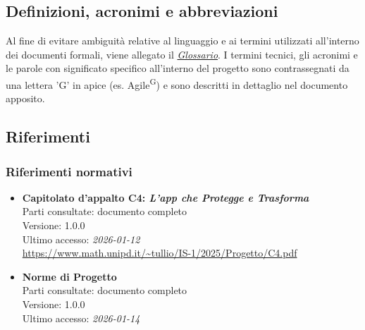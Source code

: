\documentclass[a4paper,12pt]{article}
\begin{document}

\subsection{Definizioni, acronimi e abbreviazioni} \label{sec:definizioni_acronimi_abbreviazioni}

Al fine di evitare ambiguità relative al linguaggio e ai termini utilizzati all'interno dei documenti formali, viene allegato il \href{https://swe-bitbybit.github.io/SWE-docs/docs/RTB/documenti_interni/Glossario.pdf}{\textit{Glossario}}.
I termini tecnici, gli acronimi e le parole con significato specifico all'interno del progetto sono contrassegnati da una lettera 'G' in apice (es. Agile\textsuperscript{G}) e sono descritti in dettaglio nel documento apposito.


\subsection{Riferimenti} \label{sec:riferimenti}

\subsubsection{Riferimenti normativi}\label{sec:riferimenti_normativi}
\begin{itemize}
\item \textbf{Capitolato d'appalto C4: \emph{L'app che Protegge e Trasforma}}\\
Parti consultate: documento completo\\
Versione: 1.0.0\\
Ultimo accesso: \textit{2026-01-12}\\
\url{https://www.math.unipd.it/~tullio/IS-1/2025/Progetto/C4.pdf}

\item \textbf{Norme di Progetto}\\
Parti consultate: documento completo\\
Versione: 1.0.0\\
Ultimo accesso: \textit{2026-01-14}\\
\url{} %
\end{itemize}
\end{document}
